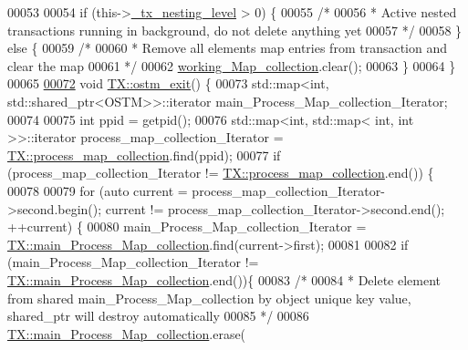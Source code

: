 \begin{DoxyCode}
00053 
00054     \textcolor{keywordflow}{if} (this->\hyperlink{class_t_x_ae8f413fd7f4fea322e7ad3c668f9898e_ae8f413fd7f4fea322e7ad3c668f9898e}{\_tx\_nesting\_level} > 0) \{
00055         \textcolor{comment}{/*}
00056 \textcolor{comment}{         * Active nested transactions running in background, do not delete anything yet}
00057 \textcolor{comment}{         */}
00058     \} \textcolor{keywordflow}{else} \{
00059         \textcolor{comment}{/* }
00060 \textcolor{comment}{         * Remove all elements map entries from transaction and clear the map}
00061 \textcolor{comment}{         */}
00062         \hyperlink{class_t_x_a81aafda16e2f20e36ec6c68e584668ff_a81aafda16e2f20e36ec6c68e584668ff}{working\_Map\_collection}.clear();
00063     \}
00064 \}
00065 
\hypertarget{_t_x_8cpp_source.tex_l00072}{}\hyperlink{class_t_x_aa9739c5c2077454c779098db7baefc2b_aa9739c5c2077454c779098db7baefc2b}{00072} \textcolor{keywordtype}{void} \hyperlink{class_t_x_aa9739c5c2077454c779098db7baefc2b_aa9739c5c2077454c779098db7baefc2b}{TX::ostm\_exit}() \{
00073     std::map<int, std::shared\_ptr<OSTM>>::iterator main\_Process\_Map\_collection\_Iterator;
00074      
00075     \textcolor{keywordtype}{int} ppid = getpid();
00076     std::map<int, std::map< int, int >>::iterator process\_map\_collection\_Iterator = 
      \hyperlink{class_t_x_aea5b8eedcd5059384155576b3979a5f6_aea5b8eedcd5059384155576b3979a5f6}{TX::process\_map\_collection}.find(ppid);
00077     \textcolor{keywordflow}{if} (process\_map\_collection\_Iterator != \hyperlink{class_t_x_aea5b8eedcd5059384155576b3979a5f6_aea5b8eedcd5059384155576b3979a5f6}{TX::process\_map\_collection}.end()) \{
00078 
00079         \textcolor{keywordflow}{for} (\textcolor{keyword}{auto} current = process\_map\_collection\_Iterator->second.begin(); current != 
      process\_map\_collection\_Iterator->second.end(); ++current) \{
00080             main\_Process\_Map\_collection\_Iterator = 
      \hyperlink{class_t_x_a1a45d726894190695314464d7cd97c29_a1a45d726894190695314464d7cd97c29}{TX::main\_Process\_Map\_collection}.find(current->first);
00081 
00082             \textcolor{keywordflow}{if} (main\_Process\_Map\_collection\_Iterator != 
      \hyperlink{class_t_x_a1a45d726894190695314464d7cd97c29_a1a45d726894190695314464d7cd97c29}{TX::main\_Process\_Map\_collection}.end())\{
00083                 \textcolor{comment}{/*}
00084 \textcolor{comment}{                 * Delete element from shared main\_Process\_Map\_collection by object unique key value,
       shared\_ptr will destroy automatically}
00085 \textcolor{comment}{                 */}
00086                 \hyperlink{class_t_x_a1a45d726894190695314464d7cd97c29_a1a45d726894190695314464d7cd97c29}{TX::main\_Process\_Map\_collection}.erase(

\end{DoxyCode}
